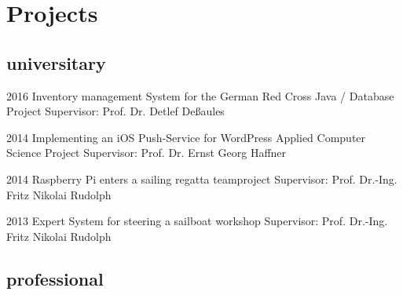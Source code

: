 \documentclass[]{friggeri-cv} %
\begin{document}

\section{Projects}

\subsection{universitary}

\begin{entrylist}

	
	\entry
	{2016}
	{Inventory management System for the German Red Cross }
	{Java / Database Project}
	{Supervisor: Prof. Dr. Detlef Deßaules}
	
	
	\entry
	{2014}
	{Implementing an iOS Push-Service for WordPress}
	{Applied Computer Science Project}
	{Supervisor: Prof. Dr. Ernst Georg Haffner}
	
	
	\entry
	{2014}
	{Raspberry Pi enters a sailing regatta}
	{teamproject}
	{Supervisor: Prof. Dr.-Ing. Fritz Nikolai Rudolph}
	
	
	\entry
	{2013}
	{Expert System for steering a sailboat}
	{workshop}
	{Supervisor: Prof. Dr.-Ing. Fritz Nikolai Rudolph}
	

\end{entrylist}

 \subsection{professional}
\end{document}
